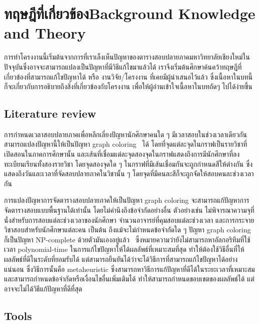 \chapter{\ifcpe ทฤษฎีที่เกี่ยวข้อง\else Background Knowledge and Theory\fi}

การทำโครงงานนี้เริ่มต้นจากการที่เราเล็งเห็นปัญหาของตารางสอบปลายภาคมหาวิทยาลัยเชียงใหม่ในปัจจุบันซึ่งอาจจะสามารถแปลงเป็นปัญหาที่มีวิธีแก้ไขมาแล้วได้ เราจึงเริ่มต้นศึกษาค้นคว้าทฤษฎีที่เกี่ยวข้องที่สามารถแก้ไขปัญหาได้ หรือ งานวิจัย/โครงงาน ที่เคยมีผู้นำเสนอไว้แล้ว
ซึ่งเนื้อหาในบทนี้ก็จะเกี่ยวกับการอธิบายถึงสิ่งที่เกี่ยวข้องกับโครงงาน เพื่อให้ผู้อ่านเข้าใจเนื้อหาในบทถัดๆ ไปได้ง่ายขึ้น
\section{Literature review}
การกำหนดเวลาสอบปลายภาคเพื่อหลีกเลี่ยงปัญหานักศึกษาคนใด ๆ มีเวลาสอบในช่วงเวลาเดียวกันสามารถแปลงปัญหานี้ให้เป็นปัญหา graph coloring~\cite{mcs} ได้ 
โดยที่จุดแต่ละจุดในกราฟเป็นรายวิชาที่เปิดสอนในภาคการศึกษานั้น 
และเส้นที่เชื่อมแต่ละจุดสองจุดในกราฟแสดงถึงการมีนักศึกษาที่ลงทะเบียนเรียนทั้งสองรายวิชา โดยจุดสองจุดใด ๆ ในกราฟที่มีเส้นเชื่อมกันจะถูกกำหนดสีให้ต่างกัน
ซึ่งแสดงถึงวันและเวลาที่จัดสอบปลายภาคในวิชานั้น ๆ โดยจุดที่มีคนละสีก็จะถูกจัดให้สอบคนละช่วงเวลากัน

การแปลงปัญหาการจัดตารางสอบปลายภาคให้เป็นปัญหา graph coloring จะสามารถแก้ปัญหาการจัดตารางสอบแบบพื้นฐานได้เท่านั้น โดยไม่คำนึงถึงข้อจำกัดอย่างอื่น 
ตัวอย่างเช่น ไม่พิจารณาความจุที่นั่งสำหรับการสอบแต่ละช่วงเวลาของนักศึกษา จำนวนอาจารย์ที่คุมสอบแต่ละช่วงเวลา และการกระจายวิชาสอบสำหรับนักศึกษาแต่ละคน เป็นต้น
ถึงแม้จะไม่กำหนดข้อจำกัดใด ๆ ปัญหา graph coloring ก็เป็นปัญหา NP-complete ด้วยตัวมันเองอยู่แล้ว~\cite{alg-design} 
ซึ่งหมายความว่ายังไม่สามารถหาอัลกอริทึมที่ใช้เวลา polynomial-time ในการแก้ไขปัญหาให้ได้ผลลัพธ์ที่เหมาะสมที่สุด 
ทำให้ต้องใช้วิธีอื่นที่ให้ผลลัพธ์ที่ดีในระดับที่ยอมรับได้ แต่สามารถยืนยันได้ว่าจะได้วิธีการที่สามารถแก้ไขปัญหาได้อย่างแน่นอน 
ซึ่งวิธีการนั้นคือ metaheuristic ซึ่งสามารถหาวิธีการแก้ปัญหาที่ดีได้ในระยะเวลาที่เหมาะสม \cite{meta-for-vertexcolor}
และสามารถกำหนดข้อจำกัดหรือเงื่อนไขอื่นเพิ่มเติมได้ ทำให้สามารถกำหนดขอบเขตของผลลัพธ์ได้ แต่อาจจะไม่ได้วิธีแก้ปัญหาที่ดีที่สุด
\section{Tools}
